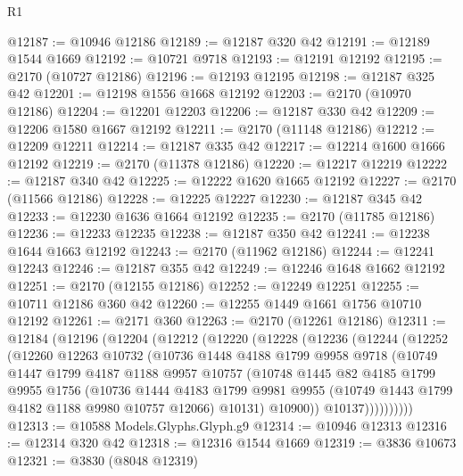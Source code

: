 \begin{lexlean}{R1}
\begin{coremodule}
@12187 := @10946 @12186
@12189 := @12187 @320 @42
@12191 := @12189 @1544 @1669
@12192 := @10721 @9718
@12193 := @12191 @12192
@12195 := @2170 (@10727 @12186)
@12196 := @12193 @12195
@12198 := @12187 @325 @42
@12201 := @12198 @1556 @1668 @12192
@12203 := @2170 (@10970 @12186)
@12204 := @12201 @12203
@12206 := @12187 @330 @42
@12209 := @12206 @1580 @1667 @12192
@12211 := @2170 (@11148 @12186)
@12212 := @12209 @12211
@12214 := @12187 @335 @42
@12217 := @12214 @1600 @1666 @12192
@12219 := @2170 (@11378 @12186)
@12220 := @12217 @12219
@12222 := @12187 @340 @42
@12225 := @12222 @1620 @1665 @12192
@12227 := @2170 (@11566 @12186)
@12228 := @12225 @12227
@12230 := @12187 @345 @42
@12233 := @12230 @1636 @1664 @12192
@12235 := @2170 (@11785 @12186)
@12236 := @12233 @12235
@12238 := @12187 @350 @42
@12241 := @12238 @1644 @1663 @12192
@12243 := @2170 (@11962 @12186)
@12244 := @12241 @12243
@12246 := @12187 @355 @42
@12249 := @12246 @1648 @1662 @12192
@12251 := @2170 (@12155 @12186)
@12252 := @12249 @12251
@12255 := @10711 @12186 @360 @42
@12260 := @12255 @1449 @1661 @1756 @10710 @12192
@12261 := @2171 @360
@12263 := @2170 (@12261 @12186)
@12311 := @12184
    (@12196
      (@12204
        (@12212
          (@12220
            (@12228
              (@12236
                (@12244
                  (@12252
                    (@12260
                      @12263
                      @10732
                      (@10736
                        @1448
                        @4188
                        @1799
                        @9958
                        @9718
                        (@10749
                          @1447
                          @1799
                          @4187
                          @1188
                          @9957
                          @10757
                          (@10748
                            @1445
                            @82
                            @4185
                            @1799
                            @9955
                            @1756
                            (@10736
                              @1444
                              @4183
                              @1799
                              @9981
                              @9955
                              (@10749 @1443 @1799 @4182 @1188 @9980 @10757 @12066)
                              @10131)
                            @10900))
                        @10137))))))))))
@12313 := @10588 Models.Glyphs.Glyph.g9
@12314 := @10946 @12313
@12316 := @12314 @320 @42
@12318 := @12316 @1544 @1669
@12319 := @3836 @10673
@12321 := @3830 (@8048 @12319)

\end{coremodule}
\end{lexlean}
